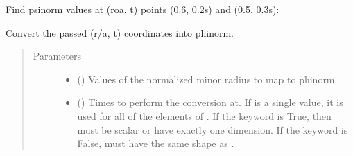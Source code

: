 \documentclass[letterpaper,10pt,english]{sphinxmanual}
\begin{document}
\begin{fulllineitems}
\begin{fulllineitems}
Find psinorm values at (roa, t) points (0.6, 0.2s) and (0.5, 0.3s):

\begin{sphinxVerbatim}[commandchars=\\\{\}]
  \PYG{p}{[} \PYG{p}{]} \PYG{p}{[} \PYG{p}{]} 
\end{sphinxVerbatim}

\end{fulllineitems}


\begin{fulllineitems}
\label{\detokenize{eqtools:eqtools.core.Equilibrium.roa2phinorm}}
Convert the passed (r/a, t) coordinates into phinorm.
\begin{quote}\begin{description}
\item[{Parameters}] \leavevmode\begin{itemize}
\item {} 
 () \textendash{} Values of the normalized minor
radius to map to phinorm.

\item {} 
 () \textendash{} Times to perform the conversion at.
If  is a single value, it is used for all of the elements of
. If the  keyword is True, then  must be scalar
or have exactly one dimension. If the  keyword is False,
 must have the same shape as .

\end{itemize}


\end{description}
\end{quote}
\end{fulllineitems}
\end{fulllineitems}
\end{document}
